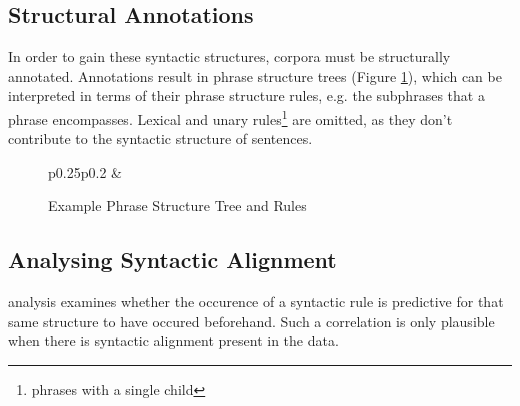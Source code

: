 \documentclass[11pt]{article}
\begin{document}
\subsection{Structural Annotations}
In order to gain these syntactic structures, corpora must be structurally annotated. Annotations result in phrase structure trees (Figure \ref{fig:tree}), which can be interpreted in terms of their phrase structure rules, e.g. the subphrases that a phrase encompasses. Lexical and unary rules\footnote{phrases with a single child} are omitted, as they don't contribute to the syntactic structure of sentences. 
\begin{figure}
  \begin{tabular}{p{}p{}}
    &
    \begin{center}
        
      \end{center}
      
    \end{tabular}
  \caption{Example Phrase Structure Tree and Rules}
  \label{fig:tree}
  
\end{figure}

\subsection{Analysing Syntactic Alignment}

 analysis examines whether the occurence of a syntactic rule is predictive for that same structure to have occured beforehand. Such a correlation is only plausible when there is syntactic alignment present in the data.
\end{document}
